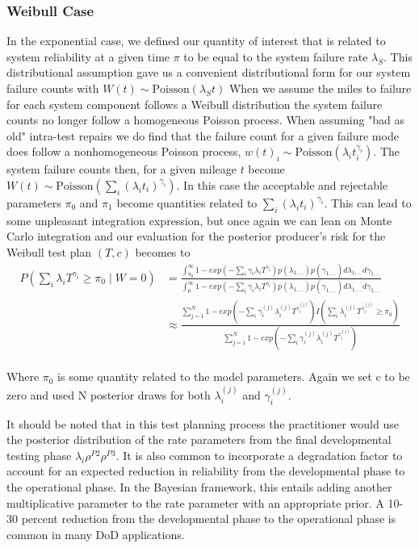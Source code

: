 \documentclass[12pt]{article}
\begin{document}
\subsubsection{Weibull Case}
In the exponential case, we defined our quantity of interest that is related to
system reliability at a given time $\pi$ to be equal to the system failure rate
$\lambda_S$.  This distributional assumption gave us a convenient distributional
form for our system failure counts with $W(t) \sim \text{Poisson}(\lambda_S t)$
When we assume the miles to failure for each system component follows a Weibull
distribution the system failure counts no longer follow a homogeneous Poisson
process.  When assuming "bad as old" intra-test repairs we do find that the
failure count for a given failure mode does follow a nonhomogeneous Poisson
process, $w(t)_i \sim \text{Poisson}( \lambda_i t_i^{\gamma_i} )$.  The system
failure counts then, for a given mileage $t$ become $W(t) \sim
\text{Poisson}(\sum_i (\lambda_i t_i)^{\gamma_i})$.  In this case the acceptable
and rejectable parameters $\pi_0$ and $\pi_1$ become quantities related to
$\sum_i (\lambda_i t_i)^{\gamma_i}$.  This can lead to some unpleasant
integration expression, but once again we can lean on Monte Carlo integration
and our evaluation for the posterior producer's risk for the Weibull test plan
$(T,c)$ becomes to
$$
\begin{aligned}
	 P(\sum_i \lambda_i T^{\gamma_i} \geq \pi_0 \; \vert \; W = 0) &= \frac{
	 \int_{\pi_0}^{\infty} 1 - exp(- \sum_i \gamma_i \lambda_i
	 T^{\gamma_i})p(\lambda_{1,...}) p(\gamma_{1,...}) d\lambda_{1,...}
	 d\gamma_{1,...}} {\int_{0}^{\infty} 1 - exp(- \sum_i \gamma_i \lambda_i
	 T^{\gamma_i})p(\lambda_{1,...}) p(\gamma_{1,...}) d\lambda_{1,...}
	 d\gamma_{1,...}} \\
   &\approx \frac{\sum_{j = 1}^{N} 1 - exp(-\sum_i \gamma_i^{(j)}
   \lambda_i^{(j)} T^{\gamma_i^{(j)}}) I(\sum_i \lambda_i^{(j)}
   T^{\gamma_i^{(j)}} \geq \pi_0)} {\sum_{j = 1}^{N} 1 - exp(- \sum_i
   \gamma_i^{(j)} \lambda_i^{(j)} T^{\gamma_i^{(j)}})}
\end{aligned}
$$
\\
Where $\pi_0$ is some quantity related to the model parameters.  Again we set c
to be zero and used N posterior draws for both $\lambda_i^{(j)}$ and
$\gamma_i^{(j)}$.

It should be noted that in this test planning process the practitioner would use
the posterior distribution of the rate parameters from the final developmental
testing phase $\lambda_i\rho^{P2}\rho^{P3}$.  It is also common to incorporate a
degradation factor to account for an expected reduction in reliability from the
developmental phase to the operational phase.  In the Bayesian framework, this
entails adding another multiplicative parameter to the rate parameter with an
appropriate prior.   A 10-30 percent reduction from the developmental phase to
the operational phase is common in many DoD applications.
\end{document}
